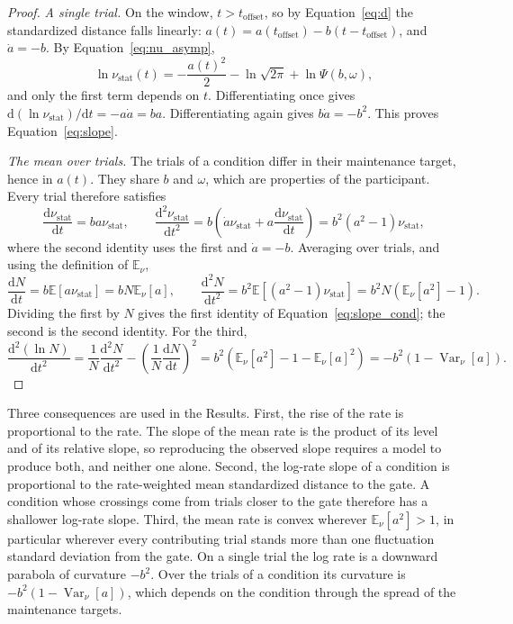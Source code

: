 \documentclass[a4paper,11pt]{article}
\theoremstyle{definition}
\newcommand{\E}{\mathbb E}
\newcommand{\Var}{\operatorname{Var}}
\newcommand{\dd}{\mathrm d}
\newcommand{\nustat}{{\nu }_{\mathrm{stat}}}
\newcommand{\1}{\mathbbm{1}}
\begin{document}
\begin{proof}
\emph{A single trial.} On the window, $t>{t}_{\mathrm{offset}}$, so by Equation~\eqref{eq:d} the standardized distance falls linearly: $a(t)=a({t}_{\mathrm{offset}})-b(t-{t}_{\mathrm{offset}})$, and $\dot{a}=-b$. By Equation~\eqref{eq:nu_asymp},
\begin{equation*}
\ln\nustat(t)=-\frac{a(t)^{2}}{2}-\ln\sqrt{2\pi}+\ln\Psi(b,\omega),
\end{equation*}
and only the first term depends on $t$.
Differentiating once gives $\dd(\ln\nustat)/\dd t=-a\dot{a}=ba$. Differentiating again gives $b\dot{a}=-b^{2}$. This proves Equation~\eqref{eq:slope}.

\emph{The mean over trials.} The trials of a condition differ in their maintenance target, hence in $a(t)$. They share $b$ and $\omega$, which are properties of the participant. Every trial therefore satisfies
\begin{equation*}
\frac{\dd\nustat}{\dd t}=ba\nustat, \qquad
\frac{\dd^{2}\nustat}{\dd t^{2}}=b\left(\dot{a}\nustat+a\frac{\dd\nustat}{\dd t}\right)=b^{2}\left(a^{2}-1\right)\nustat,
\end{equation*}
where the second identity uses the first and $\dot{a}=-b$. Averaging over trials, and using the definition of ${\E}_{\nu}$,
\begin{equation*}
\frac{\dd N}{\dd t}=b\E\left[a\nustat\right]=bN{\E}_{\nu}[a], \qquad
\frac{\dd^{2}N}{\dd t^{2}}=b^{2}\E\left[\left(a^{2}-1\right)\nustat\right]=b^{2}N\left({\E}_{\nu}\left[a^{2}\right]-1\right).
\end{equation*}
Dividing the first by $N$ gives the first identity of Equation~\eqref{eq:slope_cond}; the second is the second identity. For the third,
\begin{equation*}
\frac{\dd^{2}(\ln N)}{\dd t^{2}}=\frac{1}{N}\frac{\dd^{2}N}{\dd t^{2}}-\left(\frac{1}{N}\frac{\dd N}{\dd t}\right)^{2}=b^{2}\left({\E}_{\nu}\left[a^{2}\right]-1-{\E}_{\nu}[a]^{2}\right)=-b^{2}\left(1-{\Var}_{\nu}[a]\right).
\end{equation*}
\end{proof}

Three consequences are used in the Results. First, the rise of the rate is proportional to the rate. The slope of the mean rate is the product of its level and of its relative slope, so reproducing the observed slope requires a model to produce both, and neither one alone. Second, the log-rate slope of a condition is proportional to the rate-weighted mean standardized distance to the gate. A condition whose crossings come from trials closer to the gate therefore has a shallower log-rate slope. Third, the mean rate is convex wherever ${\E}_{\nu }\left[{a}^{2}\right]>1$, in particular wherever every contributing trial stands more than one fluctuation standard deviation from the gate. On a single trial the log rate is a downward parabola of curvature $-{b}^{2}$. Over the trials of a condition its curvature is $-{b}^{2}\left(1-{\Var}_{\nu }\left[a\right]\right)$, which depends on the condition through the spread of the maintenance targets.
\end{document}
